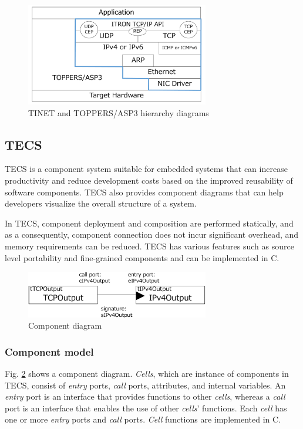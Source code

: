 \documentclass[conference]{IEEEtran/IEEEtran}
\begin{document}
\begin{figure}[t]
    \centering
    \includegraphics[width=8.0cm,clip]{figure/TINETHierarchyDiagram.pdf}
    \caption{TINET and TOPPERS/ASP3 hierarchy diagrams}
    \label{fig:TINETHierarchyDiagram}
\end{figure}

\subsection{TECS}
\label{sec:TECS}

TECS is a component system suitable for embedded systems that can increase productivity and reduce development costs based on the improved reusability of software components.
TECS also provides component diagrams that can help developers visualize the overall structure of a system.

In TECS, component deployment and composition are performed statically, and as a consequently, component connection does not incur significant overhead, and memory requirements can be reduced.
TECS has various features such as source level portability and fine-grained components and can be implemented in C.

\begin{figure}[t]
    \centering
    \includegraphics[width=8.0cm,clip]{figure/ComponentDiagram.pdf}
    \caption{Component diagram}
    \label{fig:ComponentDiagram}
\end{figure}

\subsubsection{Component model}

Fig. \ref{fig:ComponentDiagram} shows a component diagram.
{\it Cells}, which are instance of components in TECS, consist of {\it entry} ports, {\it call} ports, attributes, and internal variables.
An {\it entry} port is an interface that provides functions to other {\it cells}, whereas a {\it call} port is an interface that enables the use of other {\it cells}' functions.
Each {\it cell} has one or more {\it entry} ports and {\it call} ports.
{\it Cell} functions are implemented in C.
\end{document}
